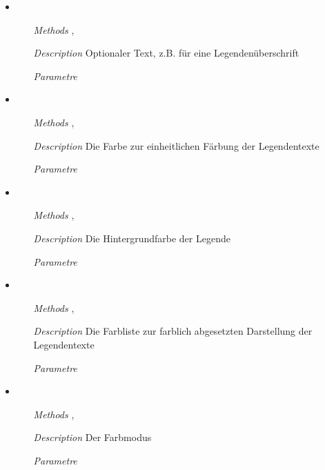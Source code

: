 \begin{itemize}
\item {}
\begin{enumerate}
\item[\textit{Methods}] ,
\item[\textit{Description}] Optionaler Text, z.B. f\"ur eine
  Legenden\"uberschrift
\item[\textit{Parametre}] 
\end{enumerate}

\item {}
\begin{enumerate}
\item[\textit{Methods}] , 
\item[\textit{Description}] Die Farbe zur einheitlichen F\"arbung der
  Legendentexte
\item[\textit{Parametre}] 
\end{enumerate}

\item {}
\begin{enumerate}
\item[\textit{Methods}] , 
\item[\textit{Description}] Die Hintergrundfarbe der Legende
\item[\textit{Parametre}] 
\end{enumerate}

\item {}
\begin{enumerate}
\item[\textit{Methods}] ,
\item[\textit{Description}] Die Farbliste zur farblich abgesetzten
  Darstellung der Legendentexte
\item[\textit{Parametre}] 
\end{enumerate}

\item {}
\begin{enumerate}
\item[\textit{Methods}] ,
\item[\textit{Description}] Der Farbmodus
\item[\textit{Parametre}] 
\end{enumerate}

\end{itemize}

